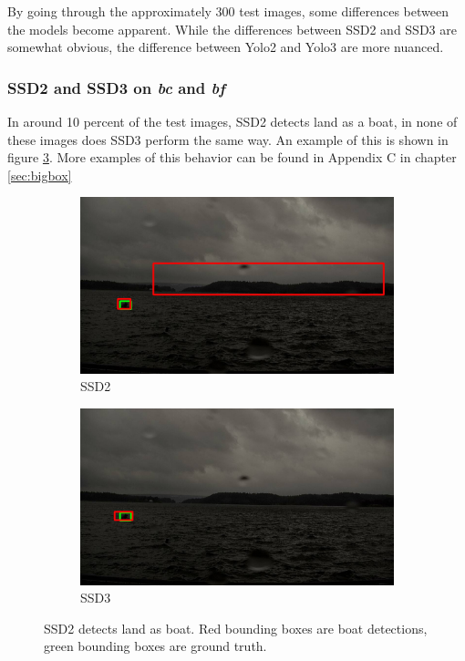 \vspace{3mm}

By going through the approximately 300 test images, some differences between the models become apparent. While the differences between SSD2 and SSD3 are somewhat obvious, the difference between Yolo2 and Yolo3 are more nuanced. 

\subsubsection{SSD2 and SSD3 on \textit{bc} and \textit{bf}}
In around 10 percent of the test images, SSD2 detects land as a boat, in none of these images does SSD3 perform the same way. An example of this is shown in figure \ref{img:bixbox_ssd}. More examples of this behavior can be found in Appendix C in chapter \ref{sec:bigbox}

\begin{figure}[h!]
\begin{subfigure}{.5\textwidth}
  \centering
  \includegraphics[width=0.9\linewidth]{results/case_buildings/bigbox_bcbf/SSD2/selected_06_14_axis0049.jpg}
  \caption{SSD2}
  \label{fig:big_box_ssd2}
\end{subfigure}%
\begin{subfigure}{.5\textwidth}
  \centering
  \includegraphics[width=.9\linewidth]{results/case_buildings/bigbox_bcbf/SSD3/selected_06_14_axis0049.jpg}
  \caption{SSD3}
  \label{fig:big_box_ssd3}
\end{subfigure}
\caption{SSD2 detects land as boat. Red bounding boxes are boat detections, green bounding boxes are ground truth.}
\label{img:bixbox_ssd}
\end{figure}

